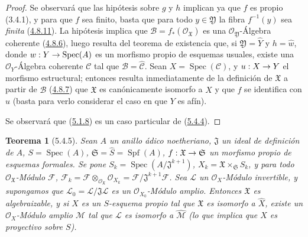 \documentclass[10pt,oneside,openany]{book}
\theoremstyle{egaenv}\newtheorem*{env}{---}
\theoremstyle{egastatement}
\newtheorem*{theorem}{Teorema}
\theoremstyle{egadescription}
\newcommand{\oldpage}[2][]{\marginnote{\normalfont\scriptsize\textbf{#1}\,|\,#2}\ignorespaces}
\renewcommand{\to}{\mathchoice{\longrightarrow}{\rightarrow}{\rightarrow}{\rightarrow}}
\begin{document}
\begin{proof}
Se observará que las hipótesis sobre $g$ y $h$ implican ya que $f$ es propio
(3.4.1), y para que $f$ sea finito, basta que para todo $y\in\mathfrak Y$ la
fibra $f^{-1}(y)$ sea \emph{finita} (\hyperref[III.4.8.11-fr]{4.8.11}). La hipótesis
implica que $\mathcal B=f_*(\mathcal O_{\mathfrak X})$ es una
$\mathcal O_{\mathfrak Y}$-Álgebra coherente
(\hyperref[III.4.8.6-fr]{4.8.6}), luego resulta del teorema de existencia que, si
$\mathfrak Y=\widehat Y$ y $h=\widehat w$, donde
$w:Y\to\operatorname{Spec}(A)$ es un morfismo propio de esquemas usuales,
existe una $\mathcal O_Y$-Álgebra coherente $\mathcal C$ tal que
$\mathcal B=\widehat{\mathcal C}$. Sean $X=\operatorname{Spec}(\mathcal C)$, y
$u:X\to Y$ el morfismo estructural; entonces resulta inmediatamente de la definición de
$\mathfrak X$ a partir de $\mathcal B$
(\hyperref[III.4.8.7-fr]{4.8.7}) que $\mathfrak X$ es canónicamente isomorfo a
$\widehat X$ y que $f$ se identifica con $\widehat u$ (basta para verlo
considerar el caso en que $Y$ es afín).

Se observará que (\hyperref[III.5.1.8-fr]{5.1.8}) es un caso particular de
(\hyperref[III.5.4.4-fr]{5.4.4}).
\end{proof}

\begin{theorem}[5.4.5]
\label{III.5.4.5-fr}
Sean $A$ un anillo ádico noetheriano, $\mathfrak J$ un ideal de definición de
$A$, $S=\operatorname{Spec}(A)$,
$\mathfrak S=\widehat S=\operatorname{Spf}(A)$,
$f:\mathfrak X\to\mathfrak S$ un morfismo propio de esquemas formales. Se pone
$S_k=\operatorname{Spec}(A/\mathfrak J^{k+1})$,
$X_k=\mathfrak X\times_{\mathfrak S}S_k$, y para todo
$\mathcal O_{\mathfrak X}$-Módulo $\mathcal F$,
$\mathcal F_k=\mathcal F\otimes_{\mathcal O_{\mathfrak X}}\mathcal O_{X_k}
=\mathcal F/\mathfrak J^{k+1}\mathcal F$.
\oldpage[III]{158}
Sea $\mathcal L$ un $\mathcal O_X$-Módulo invertible, y supongamos
que $\mathcal L_0=\mathcal L/\mathfrak J\mathcal L$ es un
$\mathcal O_{X_0}$-Módulo amplio. Entonces $\mathfrak X$ es algebraizable, y si
$X$ es un $S$-esquema propio tal que $\mathfrak X$ es isomorfo a
$\widehat X$, existe un $\mathcal O_X$-Módulo amplio $\mathcal M$ tal que
$\mathcal L$ es isomorfo a $\widehat{\mathcal M}$ \textup{(lo que implica que
$X$ es \emph{proyectivo} sobre $S$)}.
\end{theorem}
\end{document}
